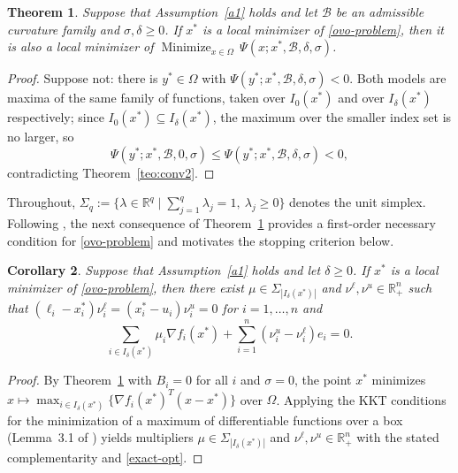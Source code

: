 \documentclass[11pt]{article}
\newcommand{\minimize}{\mathop{\text{Minimize}}}
\newtheorem{theorem}{Theorem}[section]
\newtheorem{corollary}[theorem]{Corollary}
\begin{document}
\begin{theorem} \label{teo:conv3}
Suppose that Assumption~\ref{a1} holds and let $\mathcal{B}$ be an admissible
curvature family and $\sigma, \delta \geq 0$. If $x^*$ is a local minimizer of
\eqref{ovo-problem}, then it is also a local minimizer of
$\minimize_{x \in \Omega}\, \Psi(x; x^*, \mathcal{B}, \delta, \sigma)$.
\end{theorem}

\begin{proof}
Suppose not: there is $y^* \in \Omega$ with
$\Psi(y^*; x^*, \mathcal{B}, \delta, \sigma) < 0$. Both models are maxima of the
same family of functions, taken over $I_0(x^*)$ and over $I_\delta(x^*)$
respectively; since $I_0(x^*) \subseteq I_\delta(x^*)$, the maximum over the
smaller index set is no larger, so
\[
\Psi(y^*; x^*, \mathcal{B}, 0, \sigma)
\leq \Psi(y^*; x^*, \mathcal{B}, \delta, \sigma) < 0,
\]
contradicting Theorem~\ref{teo:conv2}.
\end{proof}

Throughout, $\Sigma_q := \{ \lambda \in \mathbb{R}^q \mid
\sum_{j=1}^q \lambda_j = 1,\ \lambda_j \geq 0 \}$ denotes the unit simplex.
Following \cite{alvarezovo}, the next consequence of Theorem~\ref{teo:conv3}
provides a first-order necessary condition for \eqref{ovo-problem} and
motivates the stopping criterion below.

\begin{corollary} \label{cor:exact}
Suppose that Assumption~\ref{a1} holds and let $\delta \geq 0$. If $x^*$ is a
local minimizer of \eqref{ovo-problem}, then there exist
$\mu \in \Sigma_{|I_\delta(x^*)|}$ and $\nu^\ell, \nu^u \in \mathbb{R}^n_+$ such
that $(\ell_i - x^*_i)\nu^\ell_i = (x^*_i - u_i)\nu^u_i = 0$ for
$i = 1, \ldots, n$ and
\begin{equation} \label{exact-opt}
\sum_{i \in I_\delta(x^*)} \mu_i \nabla f_i(x^*)
+ \sum_{i=1}^n (\nu^u_i - \nu^\ell_i) e_i = 0.
\end{equation}
\end{corollary}

\begin{proof}
By Theorem~\ref{teo:conv3} with $B_i = 0$ for all $i$ and $\sigma = 0$, the
point $x^*$ minimizes
$x \mapsto \max_{i \in I_\delta(x^*)} \{ \nabla f_i(x^*)^T(x - x^*) \}$ over
$\Omega$. Applying the KKT conditions for the minimization of a maximum of
differentiable functions over a box (Lemma~3.1 of \cite{alvarezovo}) yields
multipliers $\mu \in \Sigma_{|I_\delta(x^*)|}$ and
$\nu^\ell, \nu^u \in \mathbb{R}^n_+$ with the stated complementarity and
\eqref{exact-opt}.
\end{proof}
\end{document}
